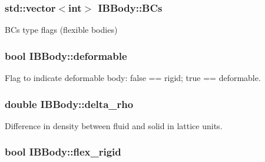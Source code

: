 \subsubsection[{\texorpdfstring{B\+Cs}{BCs}}]{\setlength{\rightskip}{0pt plus 5cm}std\+::vector$<$int$>$ I\+B\+Body\+::\+B\+Cs\hspace{0.3cm}{\ttfamily [protected]}}\hypertarget{class_i_b_body_ad9fa313d9cb2c2c463740eed5a1faf16}{}\label{class_i_b_body_ad9fa313d9cb2c2c463740eed5a1faf16}


B\+Cs type flags (flexible bodies) 

\subsubsection[{\texorpdfstring{deformable}{deformable}}]{\setlength{\rightskip}{0pt plus 5cm}bool I\+B\+Body\+::deformable\hspace{0.3cm}{\ttfamily [protected]}}\hypertarget{class_i_b_body_aac0ea66a55dcb0cf41deb2b9a82743e5}{}\label{class_i_b_body_aac0ea66a55dcb0cf41deb2b9a82743e5}


Flag to indicate deformable body\+: false == rigid; true == deformable. 

\subsubsection[{\texorpdfstring{delta\+\_\+rho}{delta_rho}}]{\setlength{\rightskip}{0pt plus 5cm}double I\+B\+Body\+::delta\+\_\+rho\hspace{0.3cm}{\ttfamily [protected]}}\hypertarget{class_i_b_body_a18cd092961f02ecde55363a4d342d098}{}\label{class_i_b_body_a18cd092961f02ecde55363a4d342d098}


Difference in density between fluid and solid in lattice units. 

\subsubsection[{\texorpdfstring{flex\+\_\+rigid}{flex_rigid}}]{\setlength{\rightskip}{0pt plus 5cm}bool I\+B\+Body\+::flex\+\_\+rigid\hspace{0.3cm}{\ttfamily [protected]}}\hypertarget{class_i_b_body_a526f3e83b45b991a79941ee745698ea5}{}\label{class_i_b_body_a526f3e83b45b991a79941ee745698ea5}


